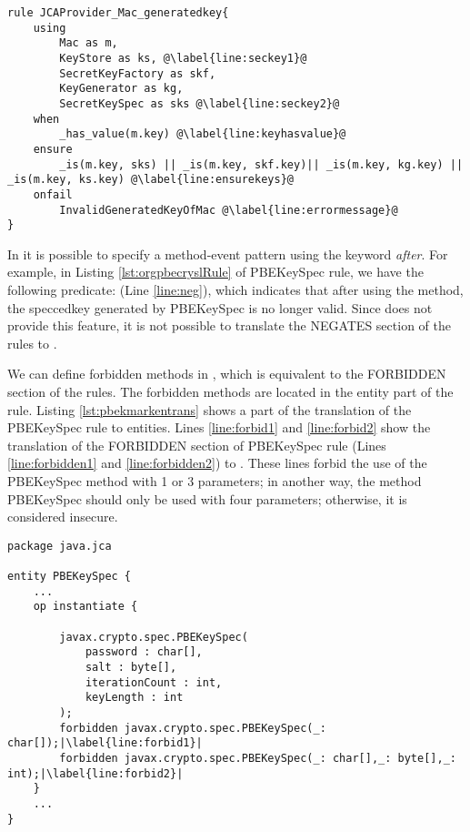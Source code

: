 \begin{lstlisting}[language=MARK2,caption= {Part of translated Mac \crysl{} rule to \MARK{} from JCA API.}, label={lst:macmarkruletrans}, escapechar=@]
rule JCAProvider_Mac_generatedkey{
	using
		Mac as m,
		KeyStore as ks, @\label{line:seckey1}@
		SecretKeyFactory as skf,
		KeyGenerator as kg,
		SecretKeySpec as sks @\label{line:seckey2}@
	when 
	    _has_value(m.key) @\label{line:keyhasvalue}@
	ensure
		_is(m.key, sks) || _is(m.key, skf.key)|| _is(m.key, kg.key) || _is(m.key, ks.key) @\label{line:ensurekeys}@
	onfail
		InvalidGeneratedKeyOfMac @\label{line:errormessage}@
}
\end{lstlisting}

In \crysl{} it is possible to specify a method-event pattern using
the keyword \emph{after}. For example, in Listing \ref{lst:orgpbecryslRule} of PBEKeySpec \crysl{} rule, we have the following predicate:  (Line \ref{line:neg}), which indicates that after using the  method, the speccedkey generated by PBEKeySpec is no longer valid. Since \MARK{} does not provide this feature, it is not possible to translate the NEGATES section of the \crysl{} rules to \MARK.


We can define forbidden methods in \MARK, which is equivalent to the FORBIDDEN section of the \crysl{} rules. The forbidden methods are located in the entity part of the \MARK{} rule. Listing \ref{lst:pbekmarkentrans} shows a part of the translation of the PBEKeySpec \crysl{} rule to \MARK{} entities. Lines \ref{line:forbid1} and \ref{line:forbid2} show the translation of the FORBIDDEN section of PBEKeySpec \crysl{} rule (Lines \ref{line:forbidden1} and \ref{line:forbidden2}) to \MARK. These lines forbid the use of the PBEKeySpec method with 1 or 3 parameters; in another way, the method PBEKeySpec should only be used with four parameters; otherwise, it is considered insecure.


\begin{lstlisting}[language=MARK,caption= {Part of Entity part of translated PBEKeySpec \crysl{} rule to \MARK{} from JCA API.}, label={lst:pbekmarkentrans}, escapechar=|]
package java.jca

entity PBEKeySpec {
    ...
	op instantiate {

		javax.crypto.spec.PBEKeySpec(
			password : char[],
			salt : byte[],
			iterationCount : int,
			keyLength : int
		);
		forbidden javax.crypto.spec.PBEKeySpec(_: char[]);|\label{line:forbid1}|
		forbidden javax.crypto.spec.PBEKeySpec(_: char[],_: byte[],_: int);|\label{line:forbid2}|
	}
    ...
}
\end{lstlisting}

